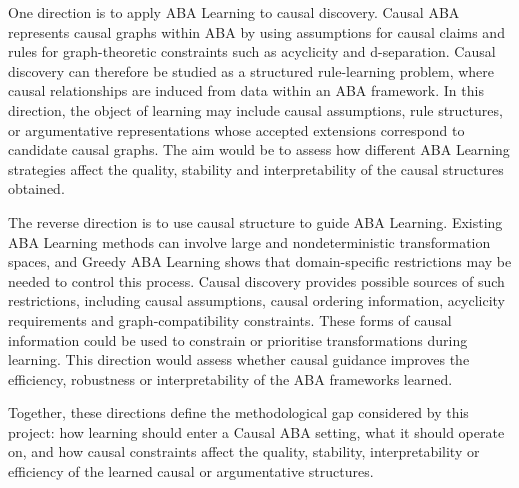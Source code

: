 One direction is to apply ABA Learning to causal discovery. Causal ABA represents causal graphs within ABA by using assumptions for causal claims and rules for graph-theoretic constraints such as acyclicity and d-separation. Causal discovery can therefore be studied as a structured rule-learning problem, where causal relationships are induced from data within an ABA framework. In this direction, the object of learning may include causal assumptions, rule structures, or argumentative representations whose accepted extensions correspond to candidate causal graphs. The aim would be to assess how different ABA Learning strategies affect the quality, stability and interpretability of the causal structures obtained.

The reverse direction is to use causal structure to guide ABA Learning. Existing ABA Learning methods can involve large and nondeterministic transformation spaces, and Greedy ABA Learning shows that domain-specific restrictions may be needed to control this process. Causal discovery provides possible sources of such restrictions, including causal assumptions, causal ordering information, acyclicity requirements and graph-compatibility constraints. These forms of causal information could be used to constrain or prioritise transformations during learning. This direction would assess whether causal guidance improves the efficiency, robustness or interpretability of the ABA frameworks learned.

Together, these directions define the methodological gap considered by this project: how learning should enter a Causal ABA setting, what it should operate on, and how causal constraints affect the quality, stability, interpretability or efficiency of the learned causal or argumentative structures.
